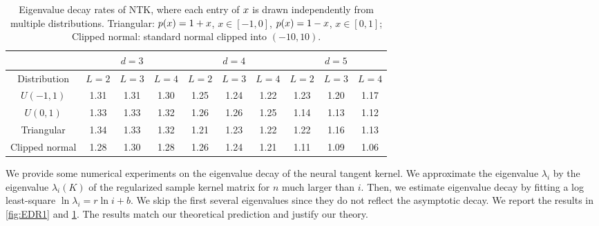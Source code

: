 \begin{table}[t]
  \centering
  \begin{tabular}{c|ccc|ccc|ccc}
    & \multicolumn{3}{c|}{$d=3$} & \multicolumn{3}{c|}{$d=4$} & \multicolumn{3}{c}{$d=5$} \\
    \hline
    Distribution   & $L=2$ & $L=3$ & $L=4$ & $L=2$ & $L=3$ & $L=4$ & $L=2$ & $L=3$ & $L=4$ \\
    \hline
    $U(-1,1)$      & 1.31  & 1.31  & 1.30  & 1.25  & 1.24  & 1.22  & 1.23  & 1.20  & 1.17  \\
    $U(0,1)$       & 1.33  & 1.33  & 1.32  & 1.26  & 1.26  & 1.25  & 1.14  & 1.13  & 1.12  \\
    Triangular     & 1.34  & 1.33  & 1.32  & 1.21  & 1.23  & 1.22  & 1.22  & 1.16  & 1.13  \\
    Clipped normal & 1.28  & 1.30  & 1.28  & 1.26  & 1.24  & 1.21  & 1.11  & 1.09  & 1.06
  \end{tabular}
  \caption{Eigenvalue decay rates of NTK, where each entry of $x$ is drawn independently from multiple distributions.
  Triangular: $p(x) = 1+x$, $x \in [-1,0]$, $p(x) = 1-x$, $x \in [0,1]$;
  Clipped normal: standard normal clipped into $(-10,10)$.}
  \label{tab:1}
\end{table}


We provide some numerical experiments on the eigenvalue decay of the neural tangent kernel.
We approximate the eigenvalue $\lambda_i$ by the eigenvalue $\lambda_i(K)$ of the regularized sample kernel matrix for $n$ much larger than $i$.
Then, we estimate eigenvalue decay by fitting a log least-square
$\ln \lambda_i = r \ln i + b$.
We skip the first several eigenvalues since they do not reflect the asymptotic decay.
We report the results in \cref{fig:EDR1} and \cref{tab:1}.
The results match our theoretical prediction and justify our theory.



